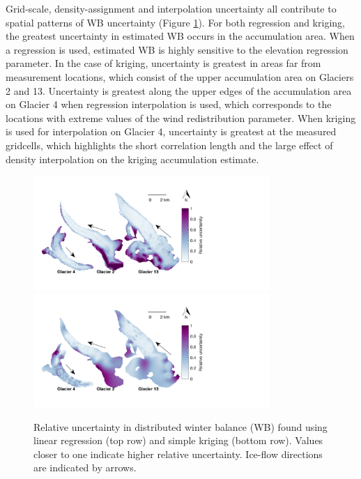 \documentclass{sfuthesis}
\begin{document}
Grid-scale, density-assignment and interpolation uncertainty all contribute to spatial patterns of WB uncertainty (Figure \ref{fig:WSMBspatialvar}).  For both regression and kriging, the greatest uncertainty in estimated WB occurs in the accumulation area. When a regression is used, estimated WB is highly sensitive to the elevation regression parameter. In the case of kriging, uncertainty is greatest in areas far from measurement locations, which consist of the upper accumulation area on Glaciers 2 and 13. Uncertainty is greatest along the upper edges of the accumulation area on Glacier 4 when regression interpolation is used, which corresponds to the locations with extreme values of the wind redistribution parameter. When kriging is used for interpolation on Glacier 4, uncertainty is greatest at the measured gridcells, which highlights the short correlation length and the large effect of density interpolation on the kriging accumulation estimate.

\begin{figure}[H]
	\centering
	\includegraphics[width =0.8\textwidth]{SpatialVar_LR.pdf}\\
	\includegraphics[width =0.8\textwidth]{SpatialVar_SK.pdf}\\
	\caption{Relative uncertainty in distributed winter balance (WB) found using linear regression (top row) and simple kriging (bottom row). Values closer to one indicate higher relative uncertainty. Ice-flow directions are indicated by arrows.}
	\label{fig:WSMBspatialvar}
\end{figure}
\end{document}
